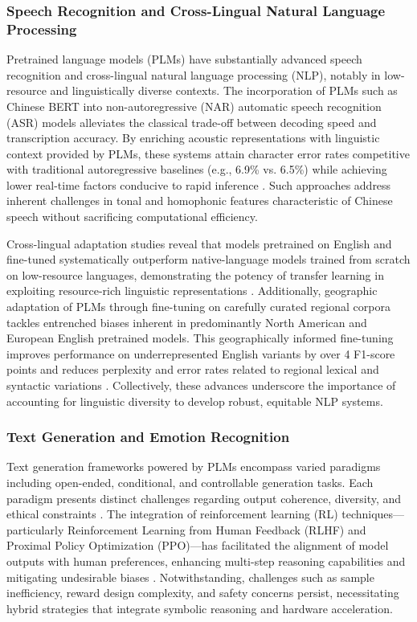 \subsubsection{Speech Recognition and Cross-Lingual Natural Language Processing}

Pretrained language models (PLMs) have substantially advanced speech recognition and cross-lingual natural language processing (NLP), notably in low-resource and linguistically diverse contexts. The incorporation of PLMs such as Chinese BERT into non-autoregressive (NAR) automatic speech recognition (ASR) models alleviates the classical trade-off between decoding speed and transcription accuracy. By enriching acoustic representations with linguistic context provided by PLMs, these systems attain character error rates competitive with traditional autoregressive baselines (e.g., 6.9\% vs. 6.5\%) while achieving lower real-time factors conducive to rapid inference \cite{ref32}. Such approaches address inherent challenges in tonal and homophonic features characteristic of Chinese speech without sacrificing computational efficiency.

Cross-lingual adaptation studies reveal that models pretrained on English and fine-tuned systematically outperform native-language models trained from scratch on low-resource languages, demonstrating the potency of transfer learning in exploiting resource-rich linguistic representations \cite{ref31}. Additionally, geographic adaptation of PLMs through fine-tuning on carefully curated regional corpora tackles entrenched biases inherent in predominantly North American and European English pretrained models. This geographically informed fine-tuning improves performance on underrepresented English variants by over 4 F1-score points and reduces perplexity and error rates related to regional lexical and syntactic variations \cite{ref30}. Collectively, these advances underscore the importance of accounting for linguistic diversity to develop robust, equitable NLP systems.

\subsubsection{Text Generation and Emotion Recognition}

Text generation frameworks powered by PLMs encompass varied paradigms including open-ended, conditional, and controllable generation tasks. Each paradigm presents distinct challenges regarding output coherence, diversity, and ethical constraints \cite{ref39}. The integration of reinforcement learning (RL) techniques—particularly Reinforcement Learning from Human Feedback (RLHF) and Proximal Policy Optimization (PPO)—has facilitated the alignment of model outputs with human preferences, enhancing multi-step reasoning capabilities and mitigating undesirable biases \cite{ref9}. Notwithstanding, challenges such as sample inefficiency, reward design complexity, and safety concerns persist, necessitating hybrid strategies that integrate symbolic reasoning and hardware acceleration.

